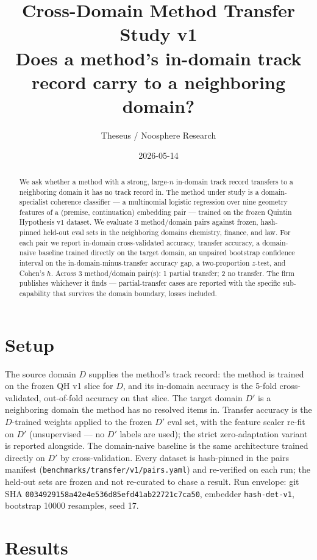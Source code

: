\documentclass[11pt]{article}
\title{Cross-Domain Method Transfer Study v1 \\ \large Does a method's
in-domain track record carry to a neighboring domain?}
\author{Theseus / Noosphere Research}
\date{2026-05-14}
\begin{document}
\maketitle


\begin{abstract}
We ask whether a method with a strong, large-$n$ in-domain track record transfers to a neighboring domain it has no track record in. The method under study is a domain-specialist coherence classifier --- a multinomial logistic regression over nine geometry features of a (premise, continuation) embedding pair --- trained on the frozen Quintin Hypothesis v1 dataset. We evaluate 3 method/domain pairs against frozen, hash-pinned held-out eval sets in the neighboring domains chemistry, finance, and law. For each pair we report in-domain cross-validated accuracy, transfer accuracy, a domain-naive baseline trained directly on the target domain, an unpaired bootstrap confidence interval on the in-domain-minus-transfer accuracy gap, a two-proportion $z$-test, and Cohen's $h$. Across 3 method/domain pair(s): 1 partial transfer; 2 no transfer. The firm publishes whichever it finds --- partial-transfer cases are reported with the specific sub-capability that survives the domain boundary, losses included.
\end{abstract}

\section{Setup}

The source domain $D$ supplies the method's track record: the method is trained on the frozen QH v1 slice for $D$, and its in-domain accuracy is the 5-fold cross-validated, out-of-fold accuracy on that slice. The target domain $D'$ is a neighboring domain the method has no resolved items in. Transfer accuracy is the $D$-trained weights applied to the frozen $D'$ eval set, with the feature scaler re-fit on $D'$ (unsupervised --- no $D'$ labels are used); the strict zero-adaptation variant is reported alongside. The domain-naive baseline is the same architecture trained directly on $D'$ by cross-validation. Every dataset is hash-pinned in the pairs manifest (\texttt{benchmarks/transfer/v1/pairs.yaml}) and re-verified on each run; the held-out sets are frozen and not re-curated to chase a result. Run envelope: git SHA \texttt{0034929158a42e4e536d85efd41ab22721c7ca50}, embedder \texttt{hash-det-v1}, bootstrap 10000 resamples, seed 17.

\section{Results}
\end{document}
